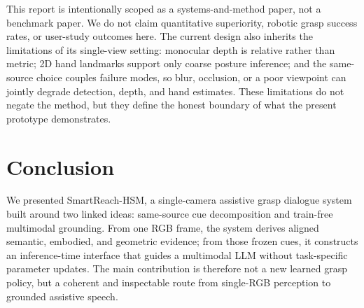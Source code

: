 \documentclass[10pt,twocolumn,letterpaper]{article}
\begin{document}
This report is intentionally scoped as a systems-and-method paper, not a benchmark paper. We do not claim quantitative superiority, robotic grasp success rates, or user-study outcomes here. The current design also inherits the limitations of its single-view setting: monocular depth is relative rather than metric; 2D hand landmarks support only coarse posture inference; and the same-source choice couples failure modes, so blur, occlusion, or a poor viewpoint can jointly degrade detection, depth, and hand estimates. These limitations do not negate the method, but they define the honest boundary of what the present prototype demonstrates.

\section{Conclusion}
We presented SmartReach-HSM, a single-camera assistive grasp dialogue system built around two linked ideas: same-source cue decomposition and train-free multimodal grounding. From one RGB frame, the system derives aligned semantic, embodied, and geometric evidence; from those frozen cues, it constructs an inference-time interface that guides a multimodal LLM without task-specific parameter updates. The main contribution is therefore not a new learned grasp policy, but a coherent and inspectable route from single-RGB perception to grounded assistive speech.

{\small


}
\end{document}
